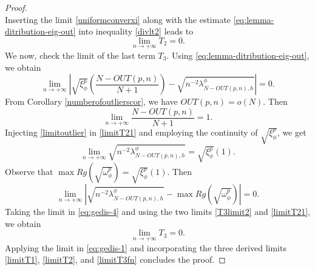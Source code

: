 \documentclass[11pt]{article}
\begin{document}
\begin{proof}
\begin{equation}
\end{equation}
Inserting the limit \eqref{uniformconverxi} along with the estimate \eqref{eq:lemma-ditribution-eig-out} into inequality \eqref{divlt2} leads to 
\begin{equation}\label{limitT2}
    \lim_{n \rightarrow +\infty} T_2=0.
\end{equation}
We now, check the limit of the last term $T_3$. Using \eqref{eq:lemma-ditribution-eig-out}, we obtain
\begin{equation}\label{limitT21}
  \lim_{n \rightarrow +\infty}  \left|\sqrt{\xi_{\phi}^p}\left(\dfrac{N-OUT(p,n)}{N+1}\right)- \sqrt{n^{-2}\lambda_{N-OUT(p,n),h}^{\phi}}   \right|=0.
\end{equation}
From Corollary \ref{numberofoutlierscor}, we have $OUT(p,n)=o(N)$. Then 
\begin{equation}\label{limitoutlier}
   \lim_{n \rightarrow +\infty}\frac{N-OUT(p,n)}{N+1}=1. 
\end{equation}
Injecting \eqref{limitoutlier} in \eqref{limitT21}  and employing the continuity of $\sqrt{\xi^p_{\phi}}$, we get
$$\lim_{n \rightarrow +\infty} \sqrt{n^{-2}\lambda_{N-OUT(p,n),h}^{\phi}} = \sqrt{\xi^p_{\phi}}(1).$$
Observe that $\max Rg\left(\sqrt{\omega^p_{\phi}}\right)=\sqrt{\xi^p_{\phi}}(1)$. Then 
\begin{equation}\label{T3limit2}
  \lim_{n \rightarrow +\infty}  \left|  \sqrt{ n^{-2}\lambda_{N-OUT(p,n),h}^{\phi}}-\max Rg\left(\sqrt{\omega_\phi^p}\right)\right|=0.
\end{equation}
Taking the limit in \eqref{eq:gedis-4} and using the two limits \eqref{T3limit2} and  \eqref{limitT21}, we obtain 
\begin{equation}\label{limitT3fn}
    \lim_{n \rightarrow +\infty} T_3=0.
\end{equation}
Applying the limit in \eqref{eq:gedis-1} and incorporating the three derived limits \eqref{limitT1}, \eqref{limitT2}, and \eqref{limitT3fn} concludes the proof.

\end{proof}
\end{document}
